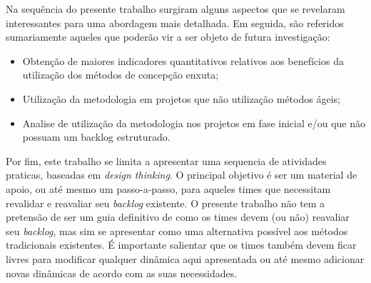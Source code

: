 \documentclass[10pt]{article}
\begin{document}
    Na sequência do presente trabalho surgiram alguns aspectos que se revelaram interessantes para uma abordagem mais detalhada. Em seguida, são referidos sumariamente aqueles que poderão vir a ser objeto de futura investigação: 
    \begin{itemize}
        \item Obtenção de maiores indicadores quantitativos relativos aos benefícios da utilização dos métodos de concepção enxuta;
        \item Utilização da metodologia em projetos que não utilização métodos ágeis;
        \item Analise de utilização da metodologia nos projetos em fase inicial e/ou que não possuam um backlog estruturado.
    \end{itemize}
    
    Por fim, este trabalho se limita a apresentar uma sequencia de atividades praticas, baseadas em \textit{design thinking}. O principal objetivo é ser um material de apoio, ou até mesmo um passo-a-passo, para aqueles times que necessitam revalidar e reavaliar seu \textit{backlog} existente. O presente trabalho não tem a pretensão de ser um guia definitivo de como os times devem (ou não) reavaliar seu \textit{backlog}, mas sim se apresentar como uma alternativa possível aos métodos tradicionais existentes. É importante salientar que os times também devem ficar livres para modificar qualquer dinâmica aqui apresentada ou até mesmo adicionar novas dinâmicas de acordo com as suas necessidades.




\renewcommand\refname{Referências}



\end{document}
